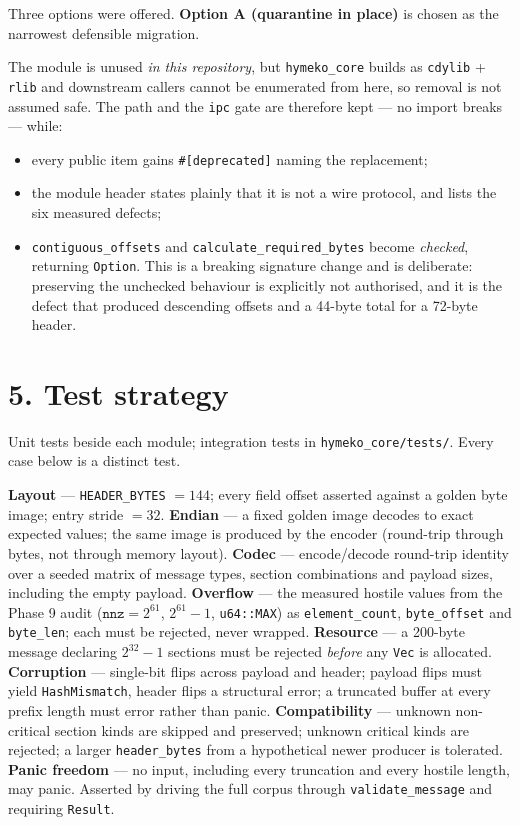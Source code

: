 \documentclass[11pt,a4paper]{article}
\begin{document}
Three options were offered. \textbf{Option A (quarantine in place)} is chosen as
the narrowest defensible migration.

The module is unused \emph{in this repository}, but \texttt{hymeko\_core} builds
as \texttt{cdylib} + \texttt{rlib} and downstream callers cannot be enumerated
from here, so removal is not assumed safe. The path and the \texttt{ipc} gate
are therefore kept --- no import breaks --- while:
\begin{itemize}\itemsep2pt
\item every public item gains \texttt{\#[deprecated]} naming the replacement;
\item the module header states plainly that it is not a wire protocol, and lists
      the six measured defects;
\item \texttt{contiguous\_offsets} and \texttt{calculate\_required\_bytes} become
      \emph{checked}, returning \texttt{Option}. This is a breaking signature
      change and is deliberate: preserving the unchecked behaviour is explicitly
      not authorised, and it is the defect that produced descending offsets and
      a 44-byte total for a 72-byte header.
\end{itemize}

\section*{5. Test strategy}

Unit tests beside each module; integration tests in
\texttt{hymeko\_core/tests/}. Every case below is a distinct test.

\textbf{Layout} --- \texttt{HEADER\_BYTES} $=144$; every field offset asserted
against a golden byte image; entry stride $=32$.
\textbf{Endian} --- a fixed golden image decodes to exact expected values; the
same image is produced by the encoder (round-trip through bytes, not through
memory layout).
\textbf{Codec} --- encode/decode round-trip identity over a seeded matrix of
message types, section combinations and payload sizes, including the empty
payload.
\textbf{Overflow} --- the measured hostile values from the Phase 9 audit
($\texttt{nnz}=2^{61}$, $2^{61}-1$, \texttt{u64::MAX}) as
\texttt{element\_count}, \texttt{byte\_offset} and \texttt{byte\_len}; each must
be rejected, never wrapped.
\textbf{Resource} --- a 200-byte message declaring $2^{32}-1$ sections must be
rejected \emph{before} any \texttt{Vec} is allocated.
\textbf{Corruption} --- single-bit flips across payload and header; payload
flips must yield \texttt{HashMismatch}, header flips a structural error; a
truncated buffer at every prefix length must error rather than panic.
\textbf{Compatibility} --- unknown non-critical section kinds are skipped and
preserved; unknown critical kinds are rejected; a larger \texttt{header\_bytes}
from a hypothetical newer producer is tolerated.
\textbf{Panic freedom} --- no input, including every truncation and every
hostile length, may panic. Asserted by driving the full corpus through
\texttt{validate\_message} and requiring \texttt{Result}.
\end{document}

